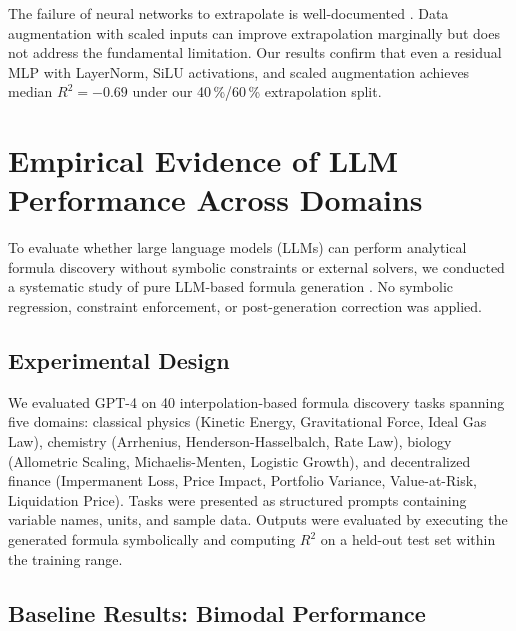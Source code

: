 \documentclass[twoside,11pt]{article}
\newcommand{\Rsq}{R^{2}}
\begin{document}
The failure of neural networks to extrapolate is well-documented \citep{xu2021neural}.
Data augmentation with scaled inputs \citep{lim2021temporal} can improve extrapolation
marginally but does not address the fundamental limitation.  Our results confirm
that even a residual MLP with LayerNorm, SiLU activations, and scaled augmentation
achieves median $\Rsq=-0.69$ under our 40\,\%/60\,\% extrapolation split.

\section{Empirical Evidence of LLM Performance Across Domains}
\label{sec:llm_limitations}

To evaluate whether large language models (LLMs) can perform analytical formula discovery without symbolic constraints or external solvers, we conducted a systematic study of pure LLM-based formula generation \citep{koza1992genetic,kambhampati2024llms}. No symbolic regression, constraint enforcement, or post-generation correction was applied.

\subsection{Experimental Design}\label{subsec:experimental-design}
\label{sec:llm_exp_design}

We evaluated GPT-4 \citep{openai2023gpt4} on 40 interpolation-based formula discovery tasks spanning five domains: classical physics (Kinetic Energy, Gravitational Force, Ideal Gas Law), chemistry (Arrhenius, Henderson-Hasselbalch, Rate Law), biology (Allometric Scaling, Michaelis-Menten, Logistic Growth), and decentralized finance (Impermanent Loss, Price Impact, Portfolio Variance, Value-at-Risk, Liquidation Price). Tasks were presented as structured prompts containing variable names, units, and sample data. Outputs were evaluated by executing the generated formula symbolically and computing $\Rsq$ on a held-out test set within the training range.

\subsection{Baseline Results: Bimodal Performance}\label{subsec:baseline-results-bimodal-performance}
\label{sec:llm_baseline}
\end{document}
